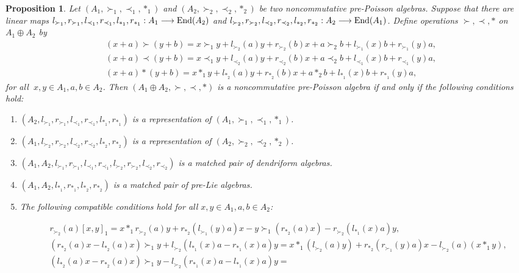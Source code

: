 \documentclass[12pt]{amsart}
\newtheorem{pro}[thm]{Proposition}
\theoremstyle{definition}
\begin{document}
\begin{pro}\label{Mp}
	 Let $(A_1,\succ_1,\prec_1,\ast_1)$ and $(A_2,\succ_2,\prec_2,\ast_2)$ be two noncommutative pre-Poisson algebras. Suppose that there are linear maps
$l_{\succ_1},r_{\succ_1},l_{\prec_1},r_{\prec_1},l_{\ast_1},r_{\ast_1}:A_1\longrightarrow
\hbox{End} (A_2)$ and
$l_{\succ_2},r_{\succ_2},l_{\prec_2},r_{\prec_2},l_{\ast_2},r_{\ast_2}:A_2\longrightarrow
\hbox{End} (A_1)$.
Define operations $\succ,\prec,\ast$ on $A_1\oplus A_2$ by
\begin{align}
&\label{ppmp eq1.1}(x+a)\succ
(y+b)=x{\succ_1}y+l_{\succ_2}(a)y+r_{\succ_2}(b)x+a{\succ_2}b+l_{\succ_1}(x)b+r_{\succ_1}(y)a,\\
&\label{ppmp eq1.2}(x+a)\prec
(y+b)=x{\prec_1}y+l_{\prec_2}(a)y+r_{\prec_2}(b)x+a{\prec_2}b+l_{\prec_1}(x)b+r_{\prec_1}(y)a,\\
&\label{ppmp eq1.3}(x+a)\ast
(y+b)=x{\ast_1}y+l_{\ast_2}(a)y+r_{\ast_2}(b)x+a{\ast_2}b+l_{\ast_1}(x)b+r_{\ast_1}(y)a,
\end{align}
for all $~x,y\in A_1,a,b\in A_2$.
Then $(A_{1}\oplus A_{2},\succ,\prec,\ast)$ is a noncommutative pre-Poisson algebra 
if and only if  the following conditions hold:
\begin{enumerate}
	\item $(A_2,l_{\succ_1},r_{\succ_1},l_{\prec_1},r_{\prec_1},l_{\ast_1},r_{\ast_1})$ is a representation of $(A_1,\succ_1,\prec_1,\ast_1)$.
	\item $(A_1,l_{\succ_2},r_{\succ_2},l_{\prec_2},r_{\prec_2},l_{\ast_2},r_{\ast_2})$ is a representation of $(A_2,\succ_2,\prec_2,\ast_2)$.
	\item $(A_1,A_2, l_{\succ_1},r_{\succ_1},l_{\prec_1},r_{\prec_1},l_{\succ_2},r_{\succ_2},l_{\prec_2},r_{\prec_2})$ 
is a matched pair of dendriform algebras.
	\item $(A_1,A_2,l_{\ast_1},r_{\ast_1},l_{\ast_2},r_{\ast_2})$ is a matched pair of pre-Lie algebras.
	\item The following compatible conditions hold for all $x,y\in A_1,a,b\in A_2$:
\begin{small}
	\begin{align}&\label{ppmp eq1.4}r_{\succ_2}(a)[x, y]_1=x\ast_{1}
		r_{\succ_2}(a)y+r_{\ast_2}(l_{\succ_1}(y)a)x-y\succ_{1}(r_{\ast_2}(a)x)-r_{\succ_2}(l_{\ast_1}(x)a)y,
\\&\label{ppmp eq1.5}
(r_{\ast_2}(a)x-l_{\ast_2}(a)x)\succ_1 y+l_{\succ_2}(l_{\ast_1}(x)a-r_{\ast_1}(x)a)y=x\ast_1(l_{\succ_2}(a)y)+
r_{\ast_2}(r_{\succ_1}(y)a)x-l_{\succ_2}(a)(x\ast_1 y),
\\&\label{ppmp eq1.6}(l_{\ast_2}(a)x-r_{\ast_2}(a)x)\succ_1 y-l_{\succ_2}(r_{\ast_1}(x)a-l_{\ast_1}(x)a)y=

\end{align}
\end{small}
\end{enumerate}
\end{pro}
\end{document}
